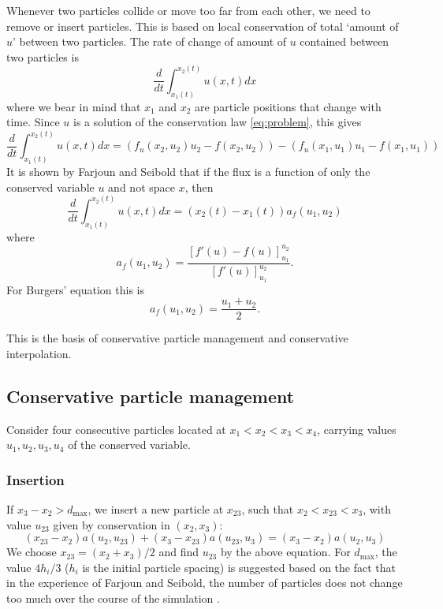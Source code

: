 \documentclass{article}
\begin{document}
Whenever two particles collide or move too far from each other, we need to remove or insert particles. This is based on local conservation of total `amount of $u$' between two particles. The rate of change of amount of $u$ contained between two particles is 
\begin{equation}
	\frac{d}{dt}\int_{x_1(t)}^{x_2(t)}u(x,t)dx
\end{equation}
where we bear in mind that $x_1$ and $x_2$ are particle positions that change with time. Since $u$ is a solution of the conservation law \eqref{eq:problem}, this gives
\begin{equation}
\frac{d}{dt}\int_{x_1(t)}^{x_2(t)}u(x,t)dx = (f_u(x_2,u_2)u_2 - f(x_2,u_2))-(f_u(x_1,u_1)u_1-f(x_1,u_1))
\end{equation}
It is shown by Farjoun and Seibold that if the flux is a function of only the conserved variable $u$ and not space $x$, then
\begin{equation}
\frac{d}{dt}\int_{x_1(t)}^{x_2(t)}u(x,t)dx = (x_2(t)-x_1(t))a_f(u_1,u_2)
\label{eq:area}
\end{equation}
where
\begin{equation}
a_f(u_1,u_2) = \frac{[f'(u)-f(u)]_{u_1}^{u_2}}{[f'(u)]_{u_1}^{u_2}}.
\end{equation}
For Burgers' equation this is
\begin{equation}
a_f(u_1,u_2) = \frac{u_1+u_2}{2}.
\end{equation}

This is the basis of conservative particle management and conservative interpolation.

\subsection{Conservative particle management}
Consider four consecutive particles located at $x_1 < x_2 < x_3 < x_4$, carrying values $u_1, u_2, u_3, u_4$ of the conserved variable.

\subsubsection{Insertion} 
If $x_3-x_2 > d_{\mathrm{max}}$, we insert a new particle at $x_{23}$, such that $x_2 < x_{23} < x_3$, with value $u_{23}$ given by conservation in $(x_2, x_3)$:
\begin{equation}
(x_{23}-x_2)a(u_2,u_{23})+(x_3-x_{23})a(u_{23},u_3) = (x_3-x_2)a(u_2,u_3)
\end{equation}
We choose $x_23 = (x_2+x_3)/2$ and find $u_{23}$ by the above equation. For $d_{\mathrm{max}}$, the value $4h_i/3$ ($h_i$ is the initial particle spacing) is suggested based on the fact that in the experience of Farjoun and Seibold, the number of particles does not change too much over the course of the simulation \cite{particle}.
\end{document}
